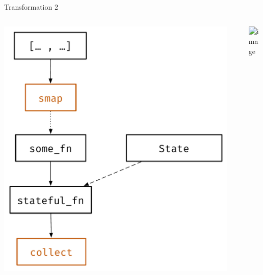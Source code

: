 \documentclass[aspectratio=169, usenames, dvipsnames]{beamer}
\begin{document}

\begin{frame}{Transformation 2}
    \centering
    \begin{columns}
        \begin{column}{0.3\textwidth}%
            \includegraphics[width=\textwidth,height=\textheight,keepaspectratio]{img/tf2_1}%
        \end{column}%
        \begin{column}{0.1\textwidth}%
            \centering
        \end{column}%
        \begin{column}{0.5\textwidth}%
            \includegraphics<2->[width=\textwidth,height=.7\textheight,keepaspectratio]{img/tf2_2}%
        \end{column}%
    \end{columns}
\end{frame}

\end{document}
